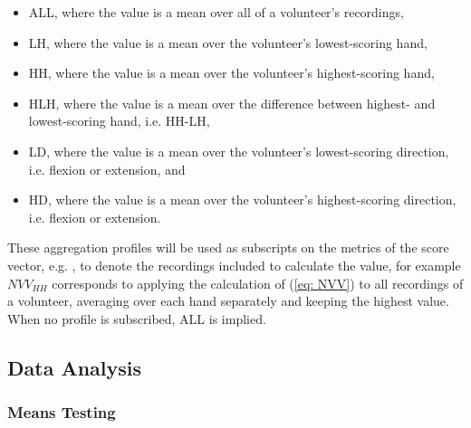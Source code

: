 \begin{itemize}
\item ALL, where the value is a mean over all of a volunteer's recordings,
\item LH, where the value is a mean over the volunteer's lowest-scoring hand,
\item HH, where the value is a mean over the volunteer's highest-scoring hand,
\item HLH, where the value is a mean over the difference between highest- and lowest-scoring hand, i.e. HH-LH,
\item LD, where the value is a mean over the volunteer's lowest-scoring direction, i.e. flexion or extension, and
\item HD, where the value is a mean over the volunteer's highest-scoring direction, i.e. flexion or extension.
\end{itemize}

These aggregation profiles will be used as subscripts on the metrics of the score vector, e.g. , to denote the recordings included to calculate the value, for example $NVV_{HH}$ corresponds to applying the calculation of (\ref{eq: NVV}) to all recordings of a volunteer, averaging over each hand separately and keeping the highest value. When no profile is subscribed, ALL is implied. 

\subsection{Data Analysis}
\label{subsec:PenCTAnalysis}
\subsubsection{Means Testing}
\label{subsubsec:PenCTMeansTesting}

